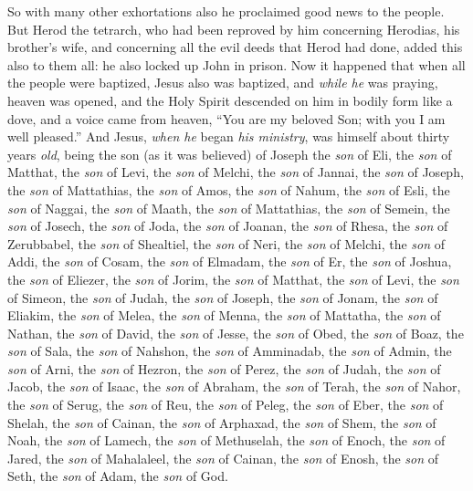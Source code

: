 \begin{biblechapter}
\verse So with many other exhortations also he proclaimed good news to the people.
\verse But Herod the tetrarch, who had been reproved by him concerning Herodias, his brother’s wife, and concerning all the evil deeds that Herod had done,
\verse added this also to them all: he also locked up John in prison.
 Now it happened that when all the people were baptized, Jesus also was baptized, and \textit{while he} was praying, heaven was opened,
\verse and the Holy Spirit descended on him in bodily form like a dove, and a voice came from heaven, “You are my beloved Son; with you I am well pleased.”
 And Jesus, \textit{when he} began \textit{his ministry}, was himself about thirty years \textit{old}, being the son (as it was believed) of Joseph the \textit{son} of Eli,
\verse the \textit{son} of Matthat, the \textit{son} of Levi, the \textit{son} of Melchi, the \textit{son} of Jannai, the \textit{son} of Joseph,
\verse the \textit{son} of Mattathias, the \textit{son} of Amos, the \textit{son} of Nahum, the \textit{son} of Esli, the \textit{son} of Naggai,
\verse the \textit{son} of Maath, the \textit{son} of Mattathias, the \textit{son} of Semein, the \textit{son} of Josech, the \textit{son} of Joda,
\verse the \textit{son} of Joanan, the \textit{son} of Rhesa, the \textit{son} of Zerubbabel, the \textit{son} of Shealtiel, the \textit{son} of Neri,
\verse the \textit{son} of Melchi, the \textit{son} of Addi, the \textit{son} of Cosam, the \textit{son} of Elmadam, the \textit{son} of Er,
\verse the \textit{son} of Joshua, the \textit{son} of Eliezer, the \textit{son} of Jorim, the \textit{son} of Matthat, the \textit{son} of Levi,
\verse the \textit{son} of Simeon, the \textit{son} of Judah, the \textit{son} of Joseph, the \textit{son} of Jonam, the \textit{son} of Eliakim,
\verse the \textit{son} of Melea, the \textit{son} of Menna, the \textit{son} of Mattatha, the \textit{son} of Nathan, the \textit{son} of David,
\verse the \textit{son} of Jesse, the \textit{son} of Obed, the \textit{son} of Boaz, the \textit{son} of Sala, the \textit{son} of Nahshon,
\verse the \textit{son} of Amminadab, the \textit{son} of Admin, the \textit{son} of Arni, the \textit{son} of Hezron, the \textit{son} of Perez, the \textit{son} of Judah,
\verse the \textit{son} of Jacob, the \textit{son} of Isaac, the \textit{son} of Abraham, the \textit{son} of Terah, the \textit{son} of Nahor,
\verse the \textit{son} of Serug, the \textit{son} of Reu, the \textit{son} of Peleg, the \textit{son} of Eber, the \textit{son} of Shelah,
\verse the \textit{son} of Cainan, the \textit{son} of Arphaxad, the \textit{son} of Shem, the \textit{son} of Noah, the \textit{son} of Lamech,
\verse the \textit{son} of Methuselah, the \textit{son} of Enoch, the \textit{son} of Jared, the \textit{son} of Mahalaleel, the \textit{son} of Cainan,
\verse the \textit{son} of Enosh, the \textit{son} of Seth, the \textit{son} of Adam, the \textit{son} of God.
\end{biblechapter}

